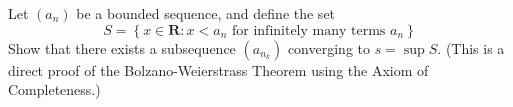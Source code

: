 \begin{exercise}
  Let $\left(a_{n}\right)$ be a bounded sequence, and define the set
  $$
  S=\left\{x \in \mathbf{R}: x<a_{n} \text { for infinitely many terms } a_{n}\right\}
  $$
  Show that there exists a subsequence $\left(a_{n_{k}}\right)$ converging to $s=\sup S$. (This is a direct proof of the Bolzano-Weierstrass Theorem using the Axiom of Completeness.)
\end{exercise}

\begin{solution}
  \TODO
\end{solution}
